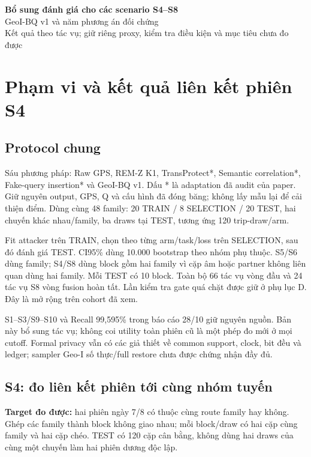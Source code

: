 \documentclass[10pt,a4paper]{article}
\begin{document}
{\setlength{\parskip}{0pt}\tableofcontents}
\clearpage{}
\begin{center}
{\LARGE\bfseries\color{ink}Bổ sung đánh giá cho các scenario S4--S8}\\[3pt]
{\large GeoI-BQ v1 và năm phương án đối chứng}\\[2pt]
{\small Kết quả theo tác vụ; giữ riêng proxy, kiểm tra điều kiện và mục tiêu chưa đo được}
\end{center}

\section{Phạm vi và kết quả liên kết phiên S4}
\subsection{Protocol chung}
Sáu phương pháp: Raw GPS, REM-Z K1, TransProtect*, Semantic correlation*, Fake-query insertion*
và GeoI-BQ v1. Dấu * là adaptation đã audit của paper. Giữ nguyên output, GPS, Q và cấu hình đã đóng băng;
không lấy mẫu lại để cải thiện điểm. Dùng cùng 48 family: 20 TRAIN / 8 SELECTION / 20 TEST,
hai chuyến khác nhau/family, ba draws tại TEST, tương ứng 120 trip-draw/arm.

Fit attacker trên TRAIN, chọn theo từng arm/task/loss trên SELECTION, sau đó đánh giá TEST.
CI95\% dùng 10.000 bootstrap theo nhóm phụ thuộc. S5/S6 dùng family; S4/S8 dùng block gồm hai family
vì cặp âm hoặc partner không liên quan dùng hai family. Mỗi TEST có 10 block. Toàn bộ 66 tác vụ vòng đầu
và 24 tác vụ S8 vòng fusion hoàn tất. Lần kiểm tra gate quá chặt được giữ ở phụ lục D.
Đây là mở rộng trên cohort đã xem.

S1--S3/S9--S10 và Recall 99,595\% trong báo cáo 28/10 giữ nguyên nguồn. Bản này bổ sung tác vụ;
không coi utility toàn phiên cũ là một phép đo mới ở mọi cutoff. Formal privacy vẫn có các giả thiết
về common support, clock, bit đều và ledger; sampler Geo-I số thực/full restore chưa được chứng nhận đầy đủ.

\subsection{S4: đo liên kết phiên tới cùng nhóm tuyến}
\textbf{Target đo được:} hai phiên ngày 7/8 có thuộc cùng route family hay không. Ghép các family thành
block không giao nhau; mỗi block/draw có hai cặp cùng family và hai cặp chéo. TEST có 120 cặp cân bằng,
không dùng hai draws của cùng một chuyến làm hai phiên dương độc lập.
\end{document}
